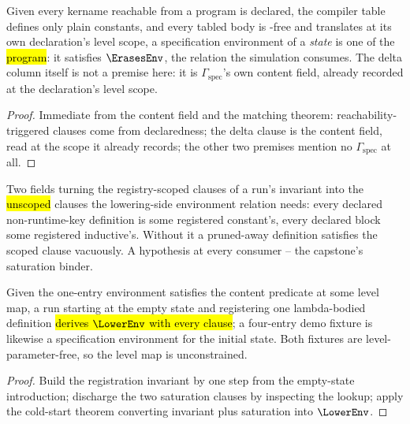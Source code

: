 \begin{lemma}
\label{lem:SpecEnv-erasesEnv}
\leanok
{}
 Given every kername reachable from a program is declared, the compiler table
defines only plain constants, and every tabled body is -free and translates at its own
declaration's level scope, a specification environment of a \emph{state} is one of the
\hl{program}: it satisfies $\ErasesEnv$, the relation the simulation consumes.
 The delta column itself is not a premise here: it is $\Gamma_{\mathrm{spec}}$'s own content
field, already recorded at the declaration's level scope.
\end{lemma}
\begin{proof}
\leanok
{}
 Immediate from the content field and the matching theorem: reachability-triggered
clauses come from declaredness; the delta clause is the content field, read at the scope it already
records; the other two premises mention no $\Gamma_{\mathrm{spec}}$ at all.
\end{proof}

\begin{definition}
\label{def:RegSaturated}
\leanok
{}
\stAssumed{}  Two fields turning the registry-scoped clauses of a run's invariant
into the \hl{unscoped} clauses the lowering-side environment relation needs: every declared
non-runtime-key definition is some registered constant's, every declared block some registered
inductive's.
 Without it a pruned-away definition satisfies the scoped clause vacuously. A
hypothesis at every consumer -- the capstone's saturation binder.
\end{definition}

\begin{proposition}
\label{prop:lowerEnv_of_cold_run}
\leanok
{}
 Given the one-entry environment satisfies the content predicate at some level map,
a run starting at the empty state and registering one lambda-bodied definition \hl{derives
$\LowerEnv$ with every clause}; a four-entry demo fixture is likewise a specification environment
for the initial state.
 Both fixtures are level-parameter-free, so the level map is unconstrained.
\end{proposition}
\begin{proof}
\leanok
{}
 Build the registration invariant by one step from the empty-state introduction;
discharge the two saturation clauses by inspecting the lookup; apply the cold-start theorem
converting invariant plus saturation into $\LowerEnv$.
\end{proof}

